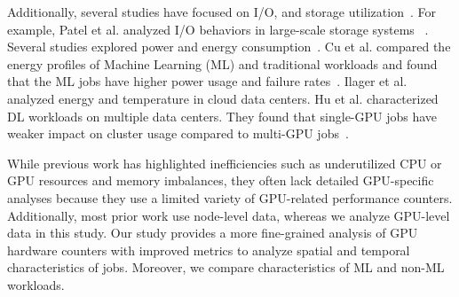 Additionally,
several studies have focused on I/O, and storage
utilization~\cite{shen2015statistical, patel2019revisiting, ren2012workload}.
For example, Patel et al. analyzed I/O behaviors in large-scale storage systems
~\cite{patel2019revisiting}.  Several studies explored power and
energy consumption~\cite{shen2015statistical, amvrosiadis2018diversity,
    li2023analyzing, ilager2023data, chu2024generic}.  Cu et al. compared the
energy profiles of Machine Learning (ML) and traditional workloads and found
that the ML jobs have higher power usage and failure
rates~\cite{chu2024generic}.  Ilager et al. ~\cite{ilager2023data} analyzed
energy and temperature in cloud data centers.  Hu et al. characterized DL
workloads on multiple data centers. They found that single-GPU
jobs have weaker impact on cluster usage compared to multi-GPU
jobs~\cite{hu2021characterization}.

While previous work has highlighted inefficiencies such as underutilized CPU or
GPU resources and memory imbalances, they often lack detailed GPU-specific
analyses because they use a limited variety of GPU-related performance
counters. Additionally, most prior work use node-level data, whereas we analyze
GPU-level data in this study.  Our study provides a more fine-grained analysis
of GPU hardware counters with improved metrics to analyze spatial and temporal
characteristics of jobs. Moreover, we compare characteristics of ML and
non-ML workloads.


